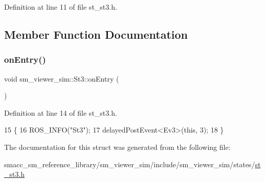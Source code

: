 Definition at line 11 of file st\+\_\+st3.\+h.



\subsection{Member Function Documentation}
\mbox{\label{structsm__viewer__sim_1_1St3_a283ea2f506562090b95a40183c6b4f41}} 
\subsubsection{\texorpdfstring{on\+Entry()}{onEntry()}}
{\footnotesize\ttfamily void sm\+\_\+viewer\+\_\+sim\+::\+St3\+::on\+Entry (\begin{DoxyParamCaption}{ }\end{DoxyParamCaption})\hspace{0.3cm}{\ttfamily [inline]}}



Definition at line 14 of file st\+\_\+st3.\+h.


\begin{DoxyCode}
15     \{
16         ROS\_INFO(\textcolor{stringliteral}{"St3"});
17         delayedPostEvent<Ev3>(\textcolor{keyword}{this}, 3);
18     \}
\end{DoxyCode}


The documentation for this struct was generated from the following file\+:\begin{DoxyCompactItemize}
\item 
smacc\+\_\+sm\+\_\+reference\+\_\+library/sm\+\_\+viewer\+\_\+sim/include/sm\+\_\+viewer\+\_\+sim/states/\hyperlink{st__st3_8h}{st\+\_\+st3.\+h}\end{DoxyCompactItemize}
